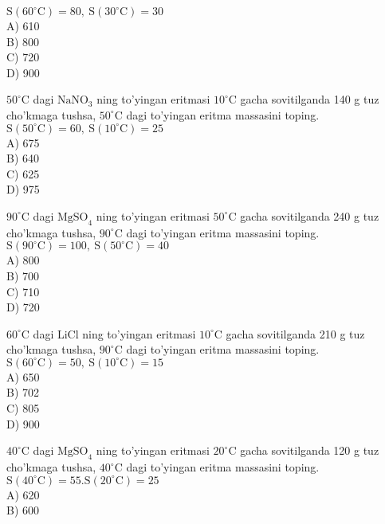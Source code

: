$\mathrm{S}\left(60^{\circ} \mathrm{C}\right)=80, \mathrm{~S}\left(30^{\circ} \mathrm{C}\right)=30$\\
A) 610\\
B) 800\\
C) 720\\
D) 900
  \item $50^{\circ} \mathrm{C}$ dagi $\mathrm{NaNO}_{3}$ ning to'yingan eritmasi $10^{\circ} \mathrm{C}$ gacha sovitilganda 140 g tuz cho'kmaga tushsa, $50^{\circ} \mathrm{C}$ dagi to'yingan eritma massasini toping.\\
$\mathrm{S}\left(50^{\circ} \mathrm{C}\right)=60, \mathrm{~S}\left(10^{\circ} \mathrm{C}\right)=25$\\
A) 675\\
B) 640\\
C) 625\\
D) 975
  \item $90^{\circ} \mathrm{C}$ dagi $\mathrm{MgSO}_{4}$ ning to'yingan eritmasi $50^{\circ} \mathrm{C}$ gacha sovitilganda 240 g tuz cho'kmaga tushsa, $90^{\circ} \mathrm{C}$ dagi to'yingan eritma massasini toping.\\
$\mathrm{S}\left(90^{\circ} \mathrm{C}\right)=100, \mathrm{~S}\left(50^{\circ} \mathrm{C}\right)=40$\\
A) 800\\
B) 700\\
C) 710\\
D) 720
  \item $60^{\circ} \mathrm{C}$ dagi LiCl ning to'yingan eritmasi $10^{\circ} \mathrm{C}$ gacha sovitilganda 210 g tuz cho'kmaga tushsa, $90^{\circ} \mathrm{C}$ dagi to'yingan eritma massasini toping.\\
$\mathrm{S}\left(60^{\circ} \mathrm{C}\right)=50, \mathrm{~S}\left(10^{\circ} \mathrm{C}\right)=15$\\
A) 650\\
B) 702\\
C) 805\\
D) 900
  \item $40^{\circ} \mathrm{C}$ dagi $\mathrm{MgSO}_{4}$ ning to'yingan eritmasi $20^{\circ} \mathrm{C}$ gacha sovitilganda 120 g tuz cho'kmaga tushsa, $40^{\circ} \mathrm{C}$ dagi to'yingan eritma massasini toping.\\
$\mathrm{S}\left(40^{\circ} \mathrm{C}\right)=55 . \mathrm{S}\left(20^{\circ} \mathrm{C}\right)=25$\\
A) 620\\
B) 600\\
